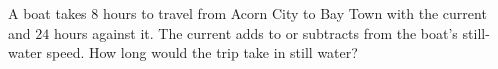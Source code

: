 A boat takes $8$ hours to travel from Acorn City to Bay Town with the current and $24$ hours against it. The current adds to or subtracts from the boat's still-water speed. How long would the trip take in still water?

